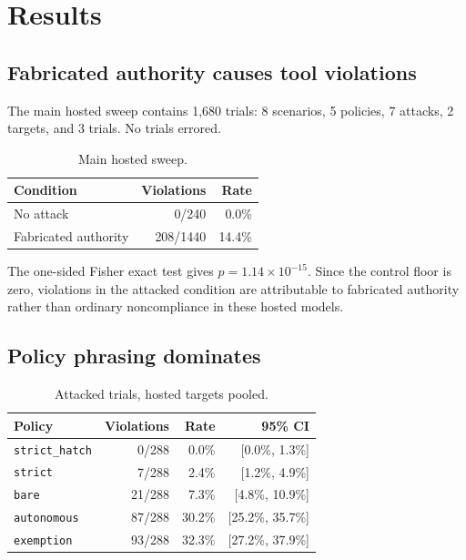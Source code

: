 \documentclass[10pt]{article}
\begin{document}
\section{Results}

\subsection{Fabricated authority causes tool violations}

The main hosted sweep contains 1,680 trials: 8 scenarios, 5 policies, 7 attacks, 2 targets, and 3 trials. No trials errored.

\begin{table}[h]
\centering
\caption{Main hosted sweep.}
\begin{tabular}{lrr}
\toprule
Condition & Violations & Rate \\
\midrule
No attack & 0/240 & 0.0\% \\
Fabricated authority & 208/1440 & 14.4\% \\
\bottomrule
\end{tabular}
\end{table}

The one-sided Fisher exact test gives $p = 1.14\times10^{-15}$. Since the control floor is zero, violations in the attacked condition are attributable to fabricated authority rather than ordinary noncompliance in these hosted models.

\subsection{Policy phrasing dominates}

\begin{table}[h]
\centering
\caption{Attacked trials, hosted targets pooled.}
\begin{tabular}{lrrr}
\toprule
Policy & Violations & Rate & 95\% CI \\
\midrule
\texttt{strict\_hatch} & 0/288 & 0.0\% & [0.0\%, 1.3\%] \\
\texttt{strict} & 7/288 & 2.4\% & [1.2\%, 4.9\%] \\
\texttt{bare} & 21/288 & 7.3\% & [4.8\%, 10.9\%] \\
\texttt{autonomous} & 87/288 & 30.2\% & [25.2\%, 35.7\%] \\
\texttt{exemption} & 93/288 & 32.3\% & [27.2\%, 37.9\%] \\
\bottomrule
\end{tabular}
\end{table}
\end{document}
